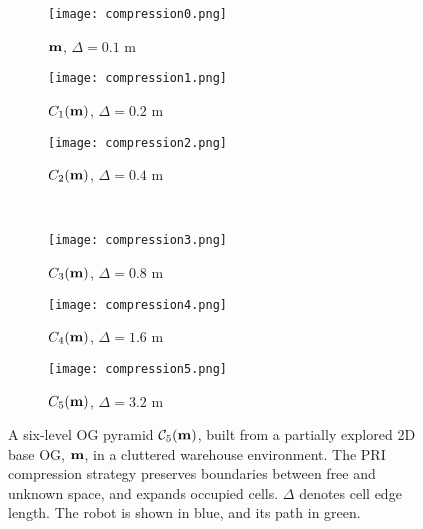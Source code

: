 \begin{figure}[H!]
  \centering
  \begin{subfigure}[t]{0.28\textwidth}
    \centering
    \texttt{[image: compression0.png]}
    \caption{$\mathbf{m}$, $\Delta = 0.1$ m \label{fig:pri_result1_a}}
  \end{subfigure}
  \hfill
  \begin{subfigure}[t]{0.28\textwidth}
    \centering
    \texttt{[image: compression1.png]}
    \caption{$C_{1}(\mathbf{m})$, $\Delta = 0.2$ m \label{fig:pri_result1_b}}
  \end{subfigure}
  \hfill
  \begin{subfigure}[t]{0.28\textwidth}
    \centering
    \texttt{[image: compression2.png]}
    \caption{$C_{2}(\mathbf{m})$, $\Delta = 0.4$ m \label{fig:pri_result1_c}}
  \end{subfigure}
  \\
  \begin{subfigure}[t]{0.28\textwidth}
    \centering
    \texttt{[image: compression3.png]}
    \caption{$C_{3}(\mathbf{m})$, $\Delta = 0.8$ m \label{fig:pri_result1_d}}
  \end{subfigure}
  \hfill
  \begin{subfigure}[t]{0.28\textwidth}
    \centering
    \texttt{[image: compression4.png]}
    \caption{$C_{4}(\mathbf{m})$, $\Delta = 1.6$ m \label{fig:pri_result1_e}}
  \end{subfigure}
  \hfill
  \begin{subfigure}[t]{0.275\textwidth}
    \centering
    \texttt{[image: compression5.png]}
    \caption{$C_{5}(\mathbf{m})$, $\Delta = 3.2$ m \label{fig:pri_result1_f}}
  \end{subfigure}
  \caption[A six-level OG pyramid built during exploration.]{A six-level OG pyramid $\mathcal{C}_{5}(\mathbf{m})$, built from a
    partially explored 2D base OG, $\mathbf{m}$, in a cluttered warehouse environment. The PRI compression strategy
    preserves boundaries between free and unknown space, and expands occupied cells.
  $\Delta$ denotes cell edge length. The robot is shown in blue, and its path in
  green.
\label{fig:pri_result1}}
\end{figure}


